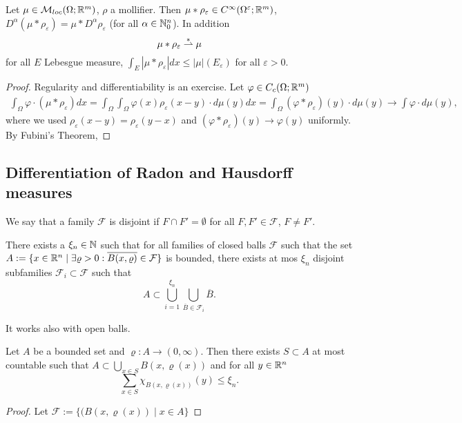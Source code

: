 \begin{theorem}
Let $\mu \in \mathcal{M}_{loc}(\Omega;\mathbb{R}^m)$, $\rho$ a mollifier. Then $\mu *
\rho_\varepsilon \in C^\infty(\Omega^\varepsilon;\mathbb{R}^m)$, $D^\alpha(\mu *
\rho_\varepsilon) = \mu * D^\alpha \rho_\varepsilon$ (for all $\alpha \in
\mathbb{N}_0^n$). In addition
\[
\mu * \rho_\varepsilon \stackrel {*}{\rightharpoonup} \mu 
\]
for all $E$ Lebesgue measure, $\int_E |\mu * \rho_\varepsilon|dx \leq
	|\mu|(E_\varepsilon)$ for all $\varepsilon >0$.
\end{theorem}
\begin{proof}
Regularity and differentiability is an exercise.
Let $\varphi \in C_c(\Omega;\mathbb{R}^m)$
\[
\begin{aligned}
\int_\Omega \varphi \cdot (\mu * \rho_\varepsilon) dx 
= \int_\Omega \int_\Omega \varphi(x) \rho_\varepsilon(x-y) \cdot d\mu(y) dx 
= \int_\Omega (\varphi * \rho_\varepsilon)(y) \cdot d\mu(y) \to \int \varphi
\cdot d\mu(y),
\end{aligned}
\]
where we used $\rho_\varepsilon(x-y) = \rho_\varepsilon(y-x)$ and
$(\varphi*\rho_\varepsilon)(y) \to \varphi(y)$ uniformly.
By Fubini's Theorem,
\TODO
\end{proof}

\subsection{Differentiation of Radon and Hausdorff measures}
We say that a family $\mathcal{F}$ is disjoint if $F \cap F' = \emptyset$ for
all $F,F' \in \mathcal{F}$, $F \neq F'$.

\begin{theorem}
There exists a $\xi_n \in \mathbb{N}$ such that for all families of closed balls
$\mathcal{F}$ such that the set 
$A: = \{ x \in \mathbb{R}^n \mid \exists \varrho > 0 : \overline{B(x,\varrho)} \in
\mathcal{F}\}$ is bounded, there exists at mos $\xi_n$ disjoint subfamilies
$\mathcal{F}_i \subset \mathcal{F}$ such that 
\[
A \subset \bigcup_{i=1}^{\xi_n} \bigcup_{\overline{B} \in \mathcal{F}_i}
\overline{B}.
\]
\end{theorem}

\begin{remark}
It works also with open balls. 
\end{remark}

\begin{theorem}
Let $A$ be a bounded set and $\varrho : A \to (0,\infty)$. Then there exists $S
\subset A$ at most countable such that 
\(
A \subset \bigcup_{x\in S} B(x,\varrho(x)) 
\)
and for all $y \in \mathbb{R}^n$
\[
\sum_{x \in S} \chi_{B(x,\varrho(x))}(y) \leq \xi_n.
\]
\end{theorem}
\begin{proof}
Let $\mathcal{F} := \{(B(x,\varrho(x)) \mid x \in A\}$ \TODO
\end{proof}

